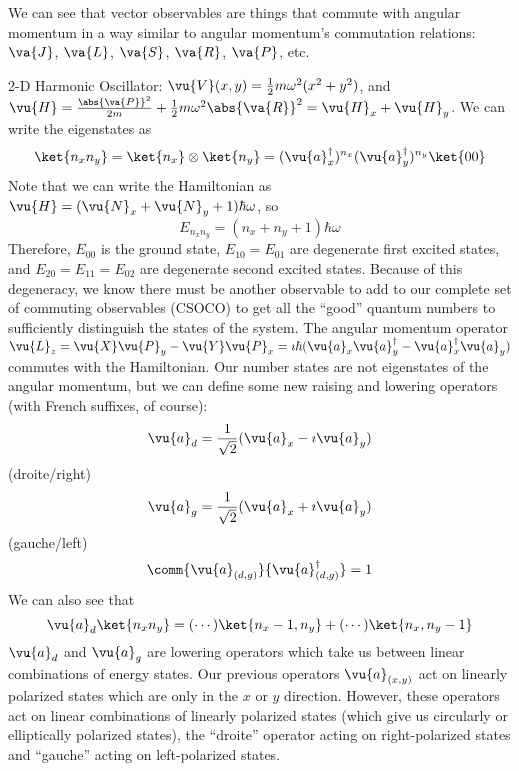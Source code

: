 \documentclass[a4paper,twoside,master.tex]{subfiles}
\begin{document}
We can see that vector observables are things that commute with angular momentum in a way similar to angular momentum's commutation relations: $ \va{J} $, $ \va{L} $, $ \va{S} $, $ \va{R} $, $ \va{P} $, etc.

\begin{ex}
    2-D Harmonic Oscillator:
    $ \vu{V}(x,y) = \frac{1}{2} m \omega^2(x^2 + y^2) $, and $ \vu{H} = \frac{\abs{ \va{P}}^2}{2m} + \frac{1}{2} m \omega^2 \abs{ \va{R}}^2 = \vu{H}_x + \vu{H}_y $. We can write the eigenstates as
    \begin{equation}
        \ket{n_x n_y} =\ket{n_x} \otimes\ket{n_y} = ( \vu{a}^\dagger_x)^{n_x} ( \vu{a}^\dagger_y)^{n_y}\ket{00}
    \end{equation}
    Note that we can write the Hamiltonian as $ \vu{H} = ( \vu{N}_x + \vu{N}_y + 1) \hbar \omega $, so
    \begin{equation}
        E_{n_x n_y} = (n_x + n_y + 1) \hbar \omega
    \end{equation}
    Therefore, $ E_{00} $ is the ground state, $ E_{10} = E_{01} $ are degenerate first excited states, and $ E_{20} = E_{11} = E_{02} $ are degenerate second excited states. Because of this degeneracy, we know there must be another observable to add to our complete set of commuting observables (CSOCO) to get all the ``good'' quantum numbers to sufficiently distinguish the states of the system. The angular momentum operator $ \vu{L}_z = \vu{X} \vu{P}_y - \vu{Y} \vu{P}_x = \imath \hbar ( \vu{a}_x \vu{a}^\dagger_y - \vu{a}^\dagger_x \vu{a}_y) $ commutes with the Hamiltonian. Our number states are not eigenstates of the angular momentum, but we can define some new raising and lowering operators (with French suffixes, of course):
    \begin{equation}
        \vu{a}_d = \frac{1}{\sqrt{2}} ( \vu{a}_x - \imath \vu{a}_y)
    \end{equation}
    (droite/right)
    \begin{equation}
        \vu{a}_g = \frac{1}{\sqrt{2}} ( \vu{a}_x + \imath \vu{a}_y)
    \end{equation}
    (gauche/left)
    \begin{equation}
        \comm{ \vu{a}_{(d,g)}}{ \vu{a}^\dagger_{(d,g)}} = 1
    \end{equation}
    We can also see that
    \begin{equation}
        \vu{a}_d\ket{n_x n_y} = (\cdots)\ket{n_x - 1, n_y} + (\cdots)\ket{n_x, n_y - 1}
    \end{equation}
    $ \vu{a}_d $ and $ \vu{a}_g $ are lowering operators which take us between linear combinations of energy states. Our previous operators $ \vu{a}_{(x,y)} $ act on linearly polarized states which are only in the $ x $ or $ y $ direction. However, these operators act on linear combinations of linearly polarized states (which give us circularly or elliptically polarized states), the ``droite'' operator acting on right-polarized states and ``gauche'' acting on left-polarized states.


\end{ex}
\end{document}
